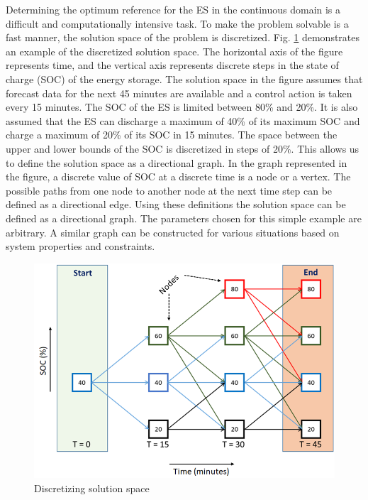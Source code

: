 Determining the optimum reference for the ES in the continuous domain is a difficult and computationally intensive task. To make the problem solvable is a fast manner, the solution space of the problem is discretized. Fig. \ref{fig:F1_Dis} demonstrates an example of the discretized solution space. The horizontal axis of the figure represents time, and the vertical axis represents discrete steps in the state of charge (SOC) of the energy storage. The solution space in the figure assumes that forecast data for the next 45 minutes are available and a control action is taken every 15 minutes. The SOC of the ES is limited between 80\% and 20\%. It is also assumed that the ES can discharge a maximum of 40\% of its maximum SOC and charge a maximum of 20\% of its SOC in 15 minutes. The space between the upper and lower bounds of the SOC is discretized in steps of 20\%. This allows us to define the solution space as a directional graph. In the graph represented in the figure, a discrete value of SOC at a discrete time is a node or a vertex. The possible paths from one node to another node at the next time step can be defined as a directional edge. Using these definitions the solution space can be defined as a directional graph. The parameters chosen for this simple example are arbitrary. A similar graph can be constructed for various situations based on system properties and constraints.

\begin{figure}[!ht]
    \centering
    \includegraphics[width = 0.6\linewidth]{figs/A8/F1_1_Dis.png}
    \caption{Discretizing solution space}
    \label{fig:F1_Dis}
\end{figure}

